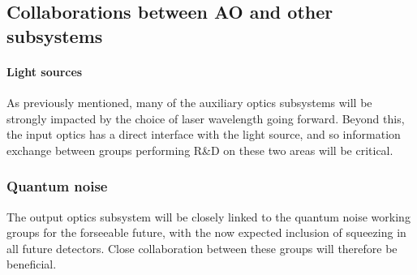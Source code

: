 \subsection{Collaborations between AO and other subsystems}
\paragraph{\bf Light sources} As previously mentioned, many of the auxiliary optics subsystems will be strongly impacted by the choice of laser wavelength going forward. Beyond this, the input optics has a direct interface with the light source, and so information exchange between groups performing R\&D on these two areas will be critical.
\subsubsection{\bf Quantum noise} The output optics subsystem will be closely linked to the quantum noise working groups for the forseeable future, with the now expected inclusion of squeezing in all future detectors. Close collaboration between these groups will therefore be beneficial.

